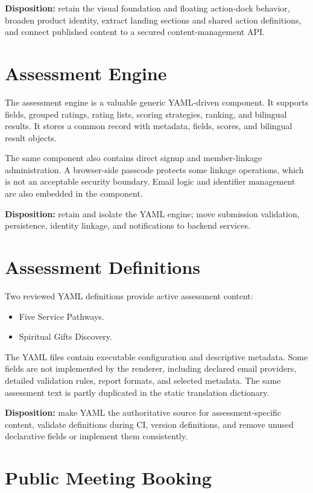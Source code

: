\documentclass[11pt,a4paper,oneside]{report}
\begin{document}
\textbf{Disposition:} retain the visual foundation and floating action-dock behavior, broaden product identity, extract landing sections and shared action definitions, and connect published content to a secured content-management API.

\section{Assessment Engine}

The assessment engine is a valuable generic YAML-driven component. It supports fields, grouped ratings, rating lists, scoring strategies, ranking, and bilingual results. It stores a common record with metadata, fields, scores, and bilingual result objects.

The same component also contains direct signup and member-linkage administration. A browser-side passcode protects some linkage operations, which is not an acceptable security boundary. Email logic and identifier management are also embedded in the component.

\textbf{Disposition:} retain and isolate the YAML engine; move submission validation, persistence, identity linkage, and notifications to backend services.

\section{Assessment Definitions}

Two reviewed YAML definitions provide active assessment content:

\begin{itemize}
  \item Five Service Pathways.
  \item Spiritual Gifts Discovery.
\end{itemize}

The YAML files contain executable configuration and descriptive metadata. Some fields are not implemented by the renderer, including declared email providers, detailed validation rules, report formats, and selected metadata. The same assessment text is partly duplicated in the static translation dictionary.

\textbf{Disposition:} make YAML the authoritative source for assessment-specific content, validate definitions during CI, version definitions, and remove unused declarative fields or implement them consistently.

\section{Public Meeting Booking}
\end{document}

